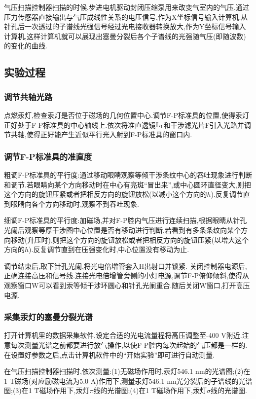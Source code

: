 \documentclass[font=default]{mpltx}
\begin{document}
气压扫描控制器扫描的时候,步进电机驱动封闭压缩泵用来改变气室内的气压,通过压力传感器直接输出与气压成线性关系的电压信号,作为X坐标信号输入计算机.从针孔后一次透过的子谱线光强信号经过光电接收器转换放大,作为Y坐标信号输入计算机,这样计算机就可以展现出塞曼分裂后各个子谱线的光强随气压(即随波数)的变化的曲线.
\subsection{实验过程}
\subsubsection{调节共轴光路}
点燃汞灯,检查汞灯是否位于磁场的几何位置中心.调节F-P标准具的位置,使得汞灯正好处于F-P标准具的中心轴线上.依次将准直透镜${\rm L_1}$和干涉滤光片F引入光路并调节共轴,使得正好能产生近似平行光入射到F-P标准具的窗口内.
\subsubsection{调节F-P标准具的准直度}
粗调F-P标准具的平行度:通过移动眼睛观察等倾干涉条纹中心的吞吐现象进行判断和调节.若眼睛向某个方向移动时在中心有亮斑``冒出来'',或中心圆环直径变大,则把这个方向的旋钮压紧或者把相反方向的旋钮放松(以减小这个方向的$h$).反复调节直到眼睛向各个方向移动时,观察不到吞吐现象.

细调F-P标准具的平行度:加磁场,并对F-P腔内气压进行连续扫描,根据眼睛从针孔光阑后观察等厚干涉图中心位置是否有移动进行判断.若看到有多条条纹向某个方向移动(升压时),则把这个方向的旋钮放松或者把相反方向的旋钮压紧(以增大这个方向的$h$).反复调节直到在压强变化时,中心位置没有移动为止.

调节结束后,取下针孔光阑,将光电倍增管套入H出射口并锁紧. 关闭控制器电源后,正确连接高压和信号线.连接光电倍增管旁侧的小灯电源,调节F-P俯仰倾斜,使得从观察窗口W可以看到汞等倾干涉环圆心和针孔光阑重合.随后关闭W窗口,打开高压电源.
\subsubsection{采集汞灯的塞曼分裂光谱}
打开计算机里的数据采集软件,设定合适的光电流量程将高压调整至-400 V附近.注意每次测量光谱之前都要进行放气操作,以使F-P腔内每次起始的气压都是一样的.在设置好参数之后,点击计算机软件中的``开始实验''即可进行自动测量.\cite{shouce}

在气压扫描控制器扫描时,依次测量:(1)无磁场作用时,汞灯546.1 nm的光谱图;(2)在1 T磁场(对应励磁电流为5.0 A)作用下,测量汞灯546.1 nm光分裂后的子谱线的光谱图;(3)在1 T磁场作用下,汞灯$\pi$线的光谱图;(4)在1 T磁场作用下,汞灯$\sigma$线的光谱图.
\end{document}
